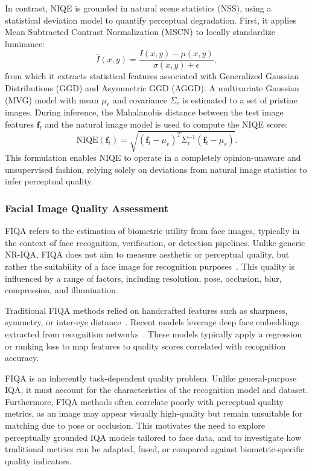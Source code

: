 In contrast, NIQE is grounded in natural scene statistics (NSS), using a statistical deviation model to quantify perceptual degradation. First, it applies Mean Subtracted Contrast Normalization (MSCN) to locally standardize luminance:
\begin{equation}
\hat{I}(x, y) = \frac{I(x, y) - \mu(x, y)}{\sigma(x, y) + \epsilon},
\end{equation}
from which it extracts statistical features associated with Generalized Gaussian Distributions (GGD) and Asymmetric GGD (AGGD). A multivariate Gaussian (MVG) model with mean $\mu_r$ and covariance $\Sigma_r$ is estimated to a set of pristine images. During inference, the Mahalanobis distance between the test image features $\mathbf{f}_t$ and the natural image model is used to compute the NIQE score:
\begin{equation}
\text{NIQE}(\mathbf{f}_t) = \sqrt{ {(\mathbf{f}_t - \mu_r)}^T \Sigma_r^{-1} (\mathbf{f}_t - \mu_r) }.
\end{equation}
This formulation enables NIQE to operate in a completely opinion-unaware and unsupervised fashion, relying solely on deviations from natural image statistics to infer perceptual quality.

\subsubsection{Facial Image Quality Assessment}\label{sec:fiqa}

FIQA refers to the estimation of biometric utility from face images, typically in the context of face recognition, verification, or detection pipelines. Unlike generic NR-IQA, FIQA does not aim to measure aesthetic or perceptual quality, but rather the suitability of a face image for recognition purposes~\cite{damer2021localfusion, best2018faceqnet}. This quality is influenced by a range of factors, including resolution, pose, occlusion, blur, compression, and illumination.

Traditional FIQA methods relied on handcrafted features such as sharpness, symmetry, or inter-eye distance~\cite{grother2003facequality}. Recent models leverage deep face embeddings extracted from recognition networks~\cite{terhorst2020serfiq, terhorst2022quality}. These models typically apply a regression or ranking loss to map features to quality scores correlated with recognition accuracy.

FIQA is an inherently task-dependent quality problem. Unlike general-purpose IQA, it must account for the characteristics of the recognition model and dataset. Furthermore, FIQA methods often correlate poorly with perceptual quality metrics, as an image may appear visually high-quality but remain unsuitable for matching due to pose or occlusion. This motivates the need to explore perceptually grounded IQA models tailored to face data, and to investigate how traditional metrics can be adapted, fused, or compared against biometric-specific quality indicators.


